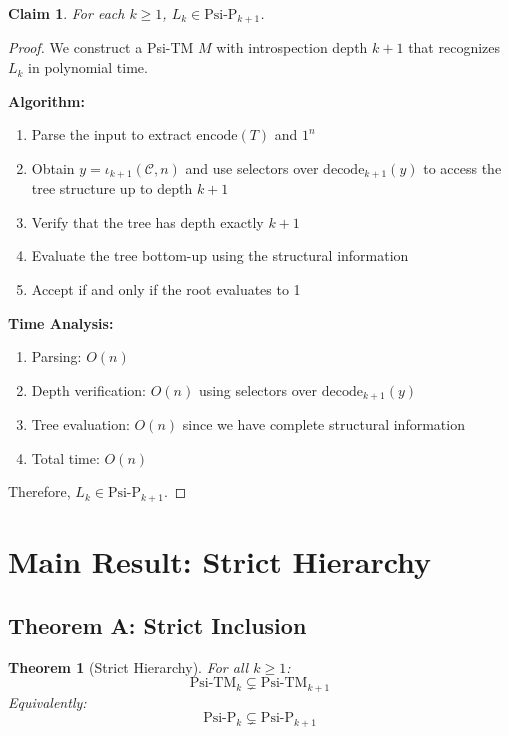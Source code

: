 \documentclass[11pt]{article}
\newtheorem{theorem}{Theorem}
\newtheorem{claim}{Claim}
\begin{document}
\begin{claim}
For each $k \geq 1$, $L_k \in \text{Psi-P}_{k+1}$.
\end{claim}

\begin{proof}
We construct a Psi-TM $M$ with introspection depth $k+1$ that recognizes $L_k$ in polynomial time.

\textbf{Algorithm:}
\begin{enumerate}
\item Parse the input to extract $\text{encode}(T)$ and $1^n$
\item Obtain $y=\iota_{k+1}(\mathcal{C},n)$ and use selectors over $\mathrm{decode}_{k+1}(y)$ to access the tree structure up to depth $k{+}1$
\item Verify that the tree has depth exactly $k+1$
\item Evaluate the tree bottom-up using the structural information
\item Accept if and only if the root evaluates to 1
\end{enumerate}

\textbf{Time Analysis:}
\begin{enumerate}
\item Parsing: $O(n)$
\item Depth verification: $O(n)$ using selectors over $\mathrm{decode}_{k+1}(y)$
\item Tree evaluation: $O(n)$ since we have complete structural information
\item Total time: $O(n)$
\end{enumerate}

Therefore, $L_k \in \text{Psi-P}_{k+1}$.
\end{proof}

\section{Main Result: Strict Hierarchy}

\subsection{Theorem A: Strict Inclusion}

\begin{theorem}[Strict Hierarchy]
\label{thm:strict-hierarchy}
For all $k \geq 1$:
$$\text{Psi-TM}_k \subsetneq \text{Psi-TM}_{k+1}$$
Equivalently:
$$\text{Psi-P}_k \subsetneq \text{Psi-P}_{k+1}$$
\end{theorem}
\end{document}
